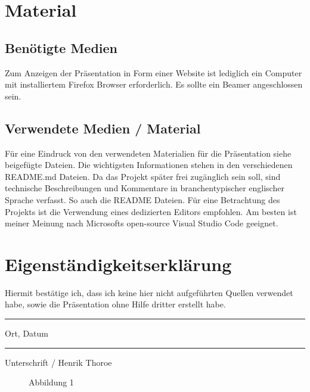 \documentclass[a4paper, 12pt, oneside]{article}
\begin{document}
    \section{Material}

    \subsection{Benötigte Medien}

    Zum Anzeigen der Präsentation in Form einer Website ist lediglich ein Computer mit 
    installiertem Firefox Browser erforderlich. Es sollte ein Beamer angeschlossen sein.

    \subsection{Verwendete Medien / Material}

    Für eine Eindruck von den verwendeten Materialien für die Präsentation siehe 
    beigefügte Dateien. Die wichtigsten Informationen stehen in den verschiedenen README.md Dateien.
    Da das Projekt später frei zugänglich sein soll, sind technische Beschreibungen und Kommentare 
    in branchentypischer englischer Sprache verfasst. So auch die README Dateien.
    Für eine Betrachtung des Projekts ist die Verwendung eines dedizierten Editors empfohlen.
    Am besten ist meiner Meinung nach Microsofts open-source Visual Studio Code geeignet.


    \cleardoublepage
    \section{Eigenständigkeitserklärung}

    Hiermit bestätige ich, dass ich keine hier nicht aufgeführten Quellen verwendet habe, sowie 
    die Präsentation ohne Hilfe dritter erstellt habe. 

    \vspace{6cm}

    \parbox{6cm}{
        \hrule
        \strut 
        \centering
        \footnotesize Ort, Datum
    } 
    \hfill
    \parbox{6cm}{
        \hrule
        \strut 
        \centering
        \footnotesize Unterschrift / Henrik Thoroe
    }

    \clearpage

    \begin{figure}
        \centering
        \caption{Abbildung 1}
    \end{figure}
\end{document}
